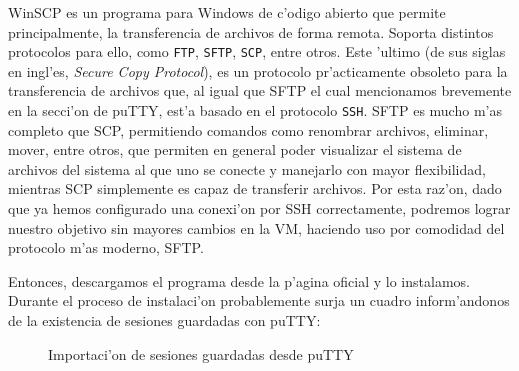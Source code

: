 \documentclass[11pt]{article}
\begin{document}
	WinSCP es un programa para Windows de c'odigo abierto que permite principalmente, la transferencia de archivos de forma remota. Soporta distintos protocolos para ello, como \texttt{FTP}, \texttt{SFTP}, \texttt{SCP}, entre otros. Este 'ultimo (de sus siglas en ingl'es, \textit{Secure Copy Protocol}), es un protocolo pr'acticamente obsoleto para la transferencia de archivos que, al igual que SFTP el cual mencionamos brevemente en la secci'on de puTTY, est'a basado en el protocolo \texttt{SSH}. SFTP es mucho m'as completo que SCP, permitiendo comandos como renombrar archivos, eliminar, mover, entre otros, que permiten en general poder visualizar el sistema de archivos del sistema al que uno se conecte y manejarlo con mayor flexibilidad, mientras SCP simplemente es capaz de transferir archivos. Por esta raz'on, dado que ya hemos configurado una conexi'on por SSH correctamente, podremos lograr nuestro objetivo sin mayores cambios en la VM, haciendo uso por comodidad del protocolo m'as moderno, SFTP.
	
	Entonces, descargamos el programa desde la p'agina oficial y lo instalamos. Durante el proceso de instalaci'on probablemente surja un cuadro inform'andonos de la existencia de sesiones guardadas con puTTY:
	
	\begin{figure}[H]
		\centering	\captionsetup{justification=centering}
		\hfill
		 \vspace{7pt}
		\caption{Importaci'on de sesiones guardadas desde puTTY}
	\end{figure}
\end{document}
